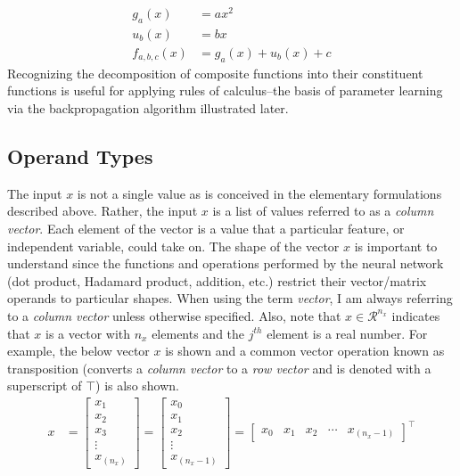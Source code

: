 \documentclass{article}
\begin{document}
\begin{align}
	g_{a}(x)     & = ax^{2}                  \\
	u_{b}(x)     & = bx                      \\
	f_{a,b,c}(x) & = g_{a}(x) + u_{b}(x) + c
\end{align}
Recognizing the decomposition of composite functions into their constituent
functions is useful for applying rules of calculus--the basis of parameter learning via
the backpropagation algorithm illustrated later.

\subsection{Operand Types}

\quad The input $x$ is not a single value as is conceived in the elementary
formulations described above. Rather, the input $x$ is a list of
values referred to as a \textit{column vector}. Each element of the vector
is a value that a particular feature, or independent variable, could take on.
The shape of the vector $x$ is important to understand since the functions and operations
performed by the neural network (dot product, Hadamard product, addition, etc.)
restrict their vector/matrix operands to particular shapes. When using the term
\textit{vector}, I am always referring to a \textit{column vector}
unless otherwise specified. Also, note that $x \in \mathcal{R}^{n_x}$ indicates
that $x$ is a vector with $n_x$ elements and the $j^{th}$ element is a real number.
For example, the below vector $x$ is shown and a common vector operation
known as transposition (converts a \textit{column vector} to a
\textit{row vector} and is denoted with a superscript of $\top$) is also shown.
\begin{align}
	x & = \begin{bmatrix}
		x_{1}  \\
		x_{2}  \\
		x_{3}  \\
		\vdots \\
		x_{(n_x)}
	\end{bmatrix}
	=
	\begin{bmatrix}
		x_{0}  \\
		x_{1}  \\
		x_{2}  \\
		\vdots \\
		x_{(n_{x}-1)}
	\end{bmatrix}
	=
	\begin{bmatrix}
		x_{0} & x_{1} & x_{2} & \cdots & x_{(n_{x}-1)}
	\end{bmatrix}^\top
\end{align}
\end{document}
